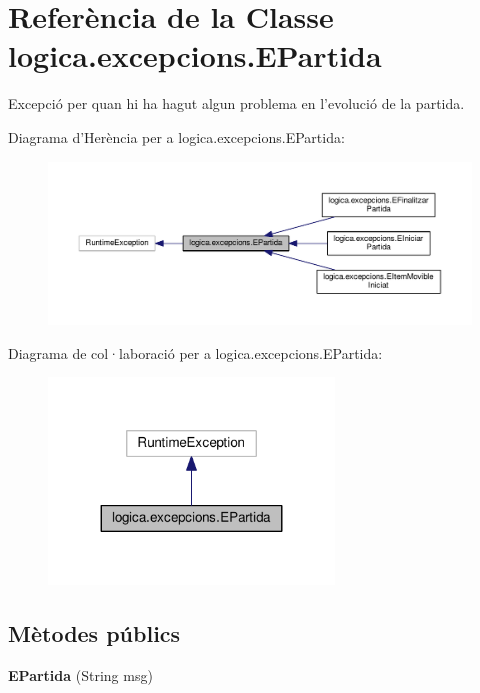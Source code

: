 \hypertarget{classlogica_1_1excepcions_1_1_e_partida}{\section{Referència de la Classe logica.\+excepcions.\+E\+Partida}
\label{classlogica_1_1excepcions_1_1_e_partida}
}


Excepció per quan hi ha hagut algun problema en l'evolució de la partida.  




Diagrama d'Herència per a logica.\+excepcions.\+E\+Partida\+:
\nopagebreak
\begin{figure}[H]
\begin{center}
\leavevmode
\includegraphics[width=350pt]{classlogica_1_1excepcions_1_1_e_partida__inherit__graph}
\end{center}
\end{figure}


Diagrama de col·laboració per a logica.\+excepcions.\+E\+Partida\+:
\nopagebreak
\begin{figure}[H]
\begin{center}
\leavevmode
\includegraphics[width=215pt]{classlogica_1_1excepcions_1_1_e_partida__coll__graph}
\end{center}
\end{figure}
\subsection*{Mètodes públics}
\begin{DoxyCompactItemize}
\item 
\hypertarget{classlogica_1_1excepcions_1_1_e_partida_a780291d9826138a6442e26774cf82aa1}{{\bfseries E\+Partida} (String msg)}\label{classlogica_1_1excepcions_1_1_e_partida_a780291d9826138a6442e26774cf82aa1}

\end{DoxyCompactItemize}


